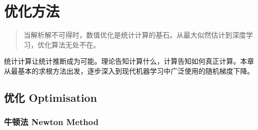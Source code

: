 \documentclass[
]{book}
\begin{document}
\chapter{优化方法}\label{ux4f18ux5316ux65b9ux6cd5}

\begin{quote}
当解析解不可得时，数值优化是统计计算的基石。从最大似然估计到深度学习，优化算法无处不在。
\end{quote}

统计计算让统计推断成为可能。理论告知计算什么，计算告知如何真正计算。本章从最基本的求根方法出发，逐步深入到现代机器学习中广泛使用的随机梯度下降。

\section{优化 Optimisation}\label{ux4f18ux5316-optimisation}

\subsection{牛顿法 Newton Method}\label{ux725bux987fux6cd5-newton-method}
\end{document}
